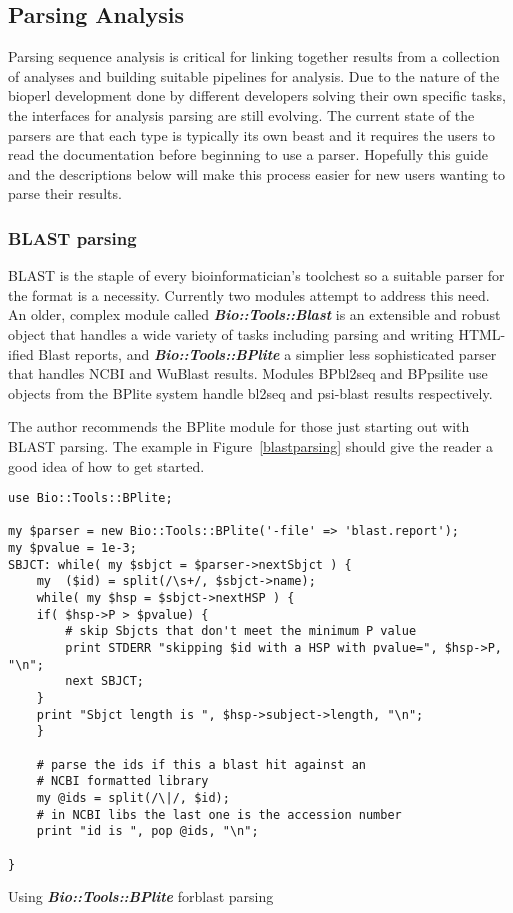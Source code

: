 \documentclass{article}
\begin{document}
\subsection{Parsing Analysis}

Parsing sequence analysis is critical for linking together results
from a collection of analyses and building suitable pipelines for
analysis.  Due to the nature of the bioperl development done by
different developers solving their own specific tasks, the interfaces
for analysis parsing are still evolving.  The current state of the
parsers are that each type is typically its own beast and it requires
the users to read the documentation before beginning to use a parser.
Hopefully this guide and the descriptions below will make this process
easier for new users wanting to parse their results.
  
\subsubsection{BLAST parsing}

BLAST is the staple of every bioinformatician's toolchest so a
suitable parser for the format is a necessity.  Currently two modules
attempt to address this need.  An older, complex module called
\emph{\bf Bio::Tools::Blast} is an extensible and robust object that
handles a wide variety of tasks including parsing and writing
HTML-ified Blast reports, and \emph{\bf Bio::Tools::BPlite} a simplier
less sophisticated parser that handles NCBI and WuBlast results.
Modules BPbl2seq and BPpsilite use objects from the BPlite system
handle bl2seq and psi-blast results respectively.   

\par The author recommends the BPlite module for those just starting
out with BLAST parsing.  The example in Figure~\ref{blastparsing}
should give the reader a good idea of how to get started.  

\begin{table}[h]
\begin{verbatim}
use Bio::Tools::BPlite;

my $parser = new Bio::Tools::BPlite('-file' => 'blast.report');
my $pvalue = 1e-3;
SBJCT: while( my $sbjct = $parser->nextSbjct ) {
    my  ($id) = split(/\s+/, $sbjct->name);
    while( my $hsp = $sbjct->nextHSP ) { 
	if( $hsp->P > $pvalue) {	
	    # skip Sbjcts that don't meet the minimum P value
	    print STDERR "skipping $id with a HSP with pvalue=", $hsp->P, "\n";
	    next SBJCT;    
	} 
	print "Sbjct length is ", $hsp->subject->length, "\n";	
    }

    # parse the ids if this a blast hit against an 
    # NCBI formatted library 
    my @ids = split(/\|/, $id);
    # in NCBI libs the last one is the accession number
    print "id is ", pop @ids, "\n";

}   
\end{verbatim}
\label{blastparsing}
\caption{Using \emph{\bf Bio::Tools::BPlite} forblast parsing}
\end{table}
\end{document}
